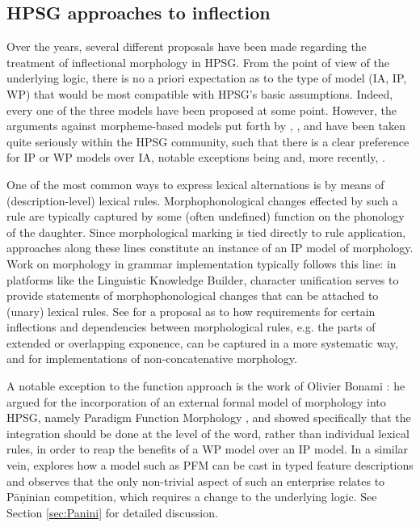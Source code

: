 \documentclass[output=paper
	        ,collection
	        ,collectionchapter
 	        ,biblatex
                ,babelshorthands
                ,newtxmath
                ,draftmode
                ,colorlinks, citecolor=brown
]{langscibook}
\begin{document}
\subsection{HPSG approaches to inflection}
\label{sec:InflHPSG}

Over the years, several different proposals have been made regarding the
treatment of inflectional morphology in HPSG. From the point of view
of the underlying logic, there is no a priori expectation as to the type of model
(IA, IP, WP) that would be most compatible with HPSG's basic
assumptions. Indeed, every one of the three models have been proposed at
some point. However, the arguments against morpheme-based models put
forth by \citet{Matthews72}, \citet{Spencer91}, \citet{Anderson92} and
\citet{Stump01} have been taken quite seriously within the HPSG
community, such that there is a clear preference for IP or WP models over
IA, notable exceptions being \citet{van-eynde_f94} and, more
recently, \citet{Emerson15}.

One of the most common ways to express lexical alternations is by
means of (description-level) lexical rules. Morphophonological changes
effected by such a rule are typically captured by some (often
undefined) function on the phonology of the daughter. Since
morphological marking is tied directly to rule application, approaches
along these lines constitute an instance of an IP model of
morphology. Work on morphology in grammar implementation typically
follows this line: in platforms like the Linguistic Knowledge
Builder\indexlkb  \citep[LKB;][]{Copestake02},
character unification serves to provide statements of
morphophonological changes that can be attached to (unary) lexical
rules. See \citet{Goodman10} for a proposal as to how requirements for
certain inflections and dependencies
between morphological rules, e.g. the parts of extended or overlapping
exponence, can be captured in a more systematic way,
and \citet{Crysmann:15:JLM,Crysmann:2017:JOMO} for implementations of
non-concatenative morphology. 


A notable exception to the function approach is the work of Olivier
Bonami \citep{bonami2015diversity,Bonami14d}: he argued for the incorporation of an
external formal model of morphology into HPSG, namely Paradigm Function
Morphology  \citep[=PFM;][]{Stump01}, and
showed specifically that the integration should be done at the level
of the word, rather than individual lexical rules, in order to reap
the benefits of a WP model over an IP model. In a similar vein,
\citet{Erjavec94} explores how a model such as PFM can be cast in
typed feature descriptions and observes that the only non-trivial
aspect of such an enterprise relates to Pāṇinian competition, which
requires a change to the underlying logic. See Section
\ref{sec:Panini} for detailed discussion.
\end{document}
